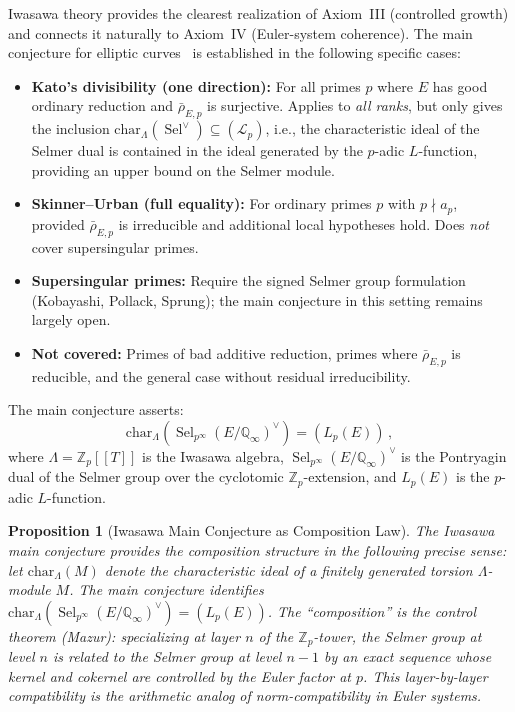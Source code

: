 \documentclass[aps,prd,twocolumn,superscriptaddress,nofootinbib,floatfix]{revtex4-2}
\newtheorem{proposition}[theorem]{Proposition}
\theoremstyle{definition}
\theoremstyle{remark}
\DeclareMathOperator{\Sel}{Sel}
\begin{document}
Iwasawa theory provides the clearest realization of Axiom~III (controlled growth) and connects it naturally to Axiom~IV (Euler-system coherence). The main conjecture for elliptic curves~\cite{Kato2004,SkinnerUrban2014} is established in the following specific cases:
\begin{itemize}
\item \textbf{Kato's divisibility (one direction):} For all primes $p$ where $E$ has good ordinary reduction and $\bar{\rho}_{E,p}$ is surjective. Applies to \textit{all ranks}, but only gives the inclusion $\mathrm{char}_\Lambda(\Sel^\vee) \subseteq (\mathcal{L}_p)$, i.e., the characteristic ideal of the Selmer dual is contained in the ideal generated by the $p$-adic $L$-function, providing an upper bound on the Selmer module.
\item \textbf{Skinner--Urban (full equality):} For ordinary primes $p$ with $p \nmid a_p$, provided $\bar{\rho}_{E,p}$ is irreducible and additional local hypotheses hold. Does \textit{not} cover supersingular primes.
\item \textbf{Supersingular primes:} Require the signed Selmer group formulation (Kobayashi, Pollack, Sprung); the main conjecture in this setting remains largely open.
\item \textbf{Not covered:} Primes of bad additive reduction, primes where $\bar{\rho}_{E,p}$ is reducible, and the general case without residual irreducibility.
\end{itemize}
The main conjecture asserts:
\begin{equation}
\mathrm{char}_{\Lambda}\!\left(\Sel_{p^\infty}(E/\mathbb{Q}_\infty)^\vee\right) = (L_p(E))\,,
\label{eq:iwasawa_mc}
\end{equation}
where $\Lambda = \mathbb{Z}_p[[T]]$ is the Iwasawa algebra, $\Sel_{p^\infty}(E/\mathbb{Q}_\infty)^\vee$ is the Pontryagin dual of the Selmer group over the cyclotomic $\mathbb{Z}_p$-extension, and $L_p(E)$ is the $p$-adic $L$-function.

\begin{proposition}[Iwasawa Main Conjecture as Composition Law]
\label{prop:iwasawa_composition}
The Iwasawa main conjecture provides the composition structure in the following precise sense: let $\mathrm{char}_\Lambda(M)$ denote the characteristic ideal of a finitely generated torsion $\Lambda$-module $M$. The main conjecture identifies $\mathrm{char}_\Lambda(\Sel_{p^\infty}(E/\mathbb{Q}_\infty)^\vee) = (L_p(E))$. The ``composition'' is the control theorem (Mazur): specializing at layer $n$ of the $\mathbb{Z}_p$-tower, the Selmer group at level $n$ is related to the Selmer group at level $n-1$ by an exact sequence whose kernel and cokernel are controlled by the Euler factor at $p$. This layer-by-layer compatibility is the arithmetic analog of norm-compatibility in Euler systems.
\end{proposition}
\end{document}
